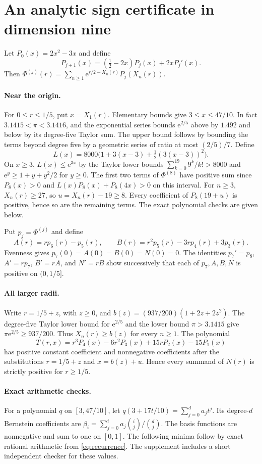 \documentclass[11pt]{article}
\newcommand{\ee}{\mathrm e}
\begin{document}
\section{An analytic sign certificate in dimension nine}
Let $P_0(x)=2x^2-3x$ and define
\begin{equation}\label{eq:recurrence}
 P_{j+1}(x)=(\tfrac12-2x)P_j(x)+2xP_j'(x).
\end{equation}
Then $\Phi^{(j)}(r)=\sum_{n\ge1}\ee^{r/2-X_n(r)}P_j(X_n(r))$.

\paragraph{Near the origin.}
For $0\le r\le1/5$, put $x=X_1(r)$. Elementary bounds give
$3\le x\le47/10$. In fact $3.1415<\pi<3.1416$, and the exponential
series bounds $\ee^{2/5}$ above by $1.492$ and below by its degree-five
Taylor sum. The upper bound follows by bounding the terms beyond
degree five by a geometric series of ratio at most $(2/5)/7$.
Define
\[
 L(x)=8000\bigl(1+3(x-3)+\tfrac12(3(x-3))^2\bigr).
\]
On $x\ge3$, $L(x)\le\ee^{3x}$ by the Taylor lower bounds
$\sum_{k=0}^{19}9^k/k!>8000$ and $\ee^y\ge1+y+y^2/2$ for $y\ge0$.
The first two terms of $\Phi^{(8)}$ have positive sum since
$P_8(x)>0$ and $L(x)P_8(x)+P_8(4x)>0$ on this interval.
For $n\ge3$, $X_n(r)\ge27$, so $u=X_n(r)-19\ge8$.
Every coefficient of $P_8(19+u)$ is positive, hence so are the remaining terms.
The exact polynomial checks are given below.

Put $p_j=\Phi^{(j)}$ and define
\[
 A(r)=rp_6(r)-p_5(r),\qquad
 B(r)=r^2p_5(r)-3rp_4(r)+3p_3(r).
\]
Evenness gives $p_7(0)=A(0)=B(0)=N(0)=0$. The identities
$p_7'=p_8$, $A'=rp_7$, $B'=rA$, and $N'=rB$ show successively
that each of $p_7,A,B,N$ is positive on $(0,1/5]$.

\paragraph{All larger radii.}
Write $r=1/5+z$, with $z\ge0$, and
$b(z)=(937/200)(1+2z+2z^2)$.
The degree-five Taylor lower bound for $\ee^{2/5}$ and the lower
bound $\pi>3.1415$ give $\pi\ee^{2/5}\ge937/200$.
Thus $X_n(r)\ge b(z)$ for every $n\ge1$. The polynomial
\[
 T(r,x)=r^3P_4(x)-6r^2P_3(x)+15rP_2(x)-15P_1(x)
\]
has positive constant coefficient and nonnegative coefficients after
the substitutions $r=1/5+z$ and $x=b(z)+u$. Hence every summand
of $N(r)$ is strictly positive for $r\ge1/5$.

\paragraph{Exact arithmetic checks.}
For a polynomial $q$ on $[3,47/10]$, let
$q(3+17t/10)=\sum_{j=0}^d a_j t^j$. Its degree-$d$ Bernstein
coefficients are $\beta_i=\sum_{j=0}^i a_j\binom{i}{j}/\binom{d}{j}$.
The basis functions are nonnegative and sum to one on $[0,1]$.
The following minima follow by exact rational arithmetic from
\eqref{eq:recurrence}. The supplement includes a short independent
checker for these values.
\end{document}
